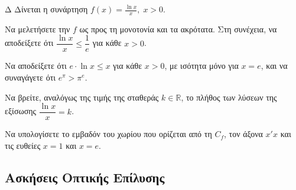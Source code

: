 \begin{thema}{Δ}
Δίνεται η συνάρτηση $\displaystyle f(x) = \frac{\ln x}{x}, \; x > 0$.
\begin{erwthma}
    \item Να μελετήσετε την $f$ ως προς τη μονοτονία και τα ακρότατα. Στη συνέχεια, να αποδείξετε ότι $\dfrac{\ln x}{x} \le \dfrac{1}{e}$ για κάθε $x > 0$.
    \item Να αποδείξετε ότι $e \cdot \ln x \le x$ για κάθε $x > 0$, με ισότητα μόνο για $x = e$, και να συναγάγετε ότι $e^\pi > \pi^e$.
    \item Να βρείτε, αναλόγως της τιμής της σταθεράς $k \in \mathbb{R}$, το πλήθος των λύσεων της εξίσωσης $\dfrac{\ln x}{x} = k$.
    \item Να υπολογίσετε το εμβαδόν του χωρίου που ορίζεται από τη $C_f$, τον άξονα $x'x$ και τις ευθείες $x = 1$ και $x = e$.
\end{erwthma}
\end{thema}

\subsection*{Ασκήσεις Οπτικής Επίλυσης}

